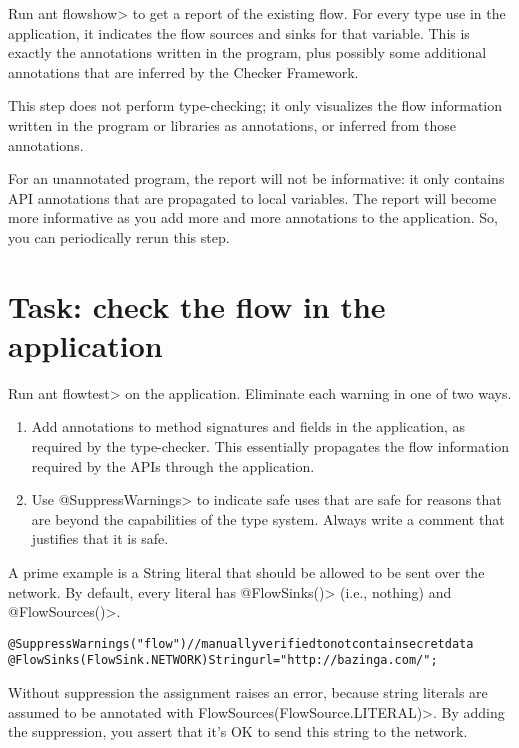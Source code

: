 Run \<ant flowshow> to get a report of the
existing flow.
For every type use in the application, it indicates the flow sources
and sinks for that variable. This is exactly the annotations written
in the program, plus possibly some additional annotations that are
inferred by the Checker Framework.


This step does not perform type-checking; it only visualizes the flow
information written in the program or libraries as annotations, or
inferred from those annotations.


For an unannotated program, the report will not be informative: it
only contains API annotations that are propagated to local
variables. The report will become more informative as you add more and
more annotations to the application. So, you can periodically rerun
this step. 


\section{Task: check the flow in the application}

Run \<ant flowtest> on the application.
Eliminate each warning in one of two ways.
\begin{enumerate}
\item Add annotations to method signatures and fields in the application, as
required by the type-checker. This essentially propagates the flow
information required by the APIs through the application.

\item Use \<@SuppressWarnings> to indicate safe uses that are safe for reasons
that are beyond the capabilities of the type system. Always write a
comment that justifies that it is safe.
\end{enumerate}
A prime example is a String literal that should be allowed to be sent
over the network. By default, every literal has \<@FlowSinks()>
(i.e., nothing) and \<@FlowSources()>.

\begin{alltt}
    @SuppressWarnings("flow") // manually verified to not contain secret data
    @FlowSinks(FlowSink.NETWORK) String url = "http://bazinga.com/";
\end{alltt}

\noindent
Without suppression the assignment raises an error, because string literals
are assumed to be annotated with \<FlowSources(FlowSource.LITERAL)>. By adding the suppression, you
assert that it's OK to send this string to the network. 

